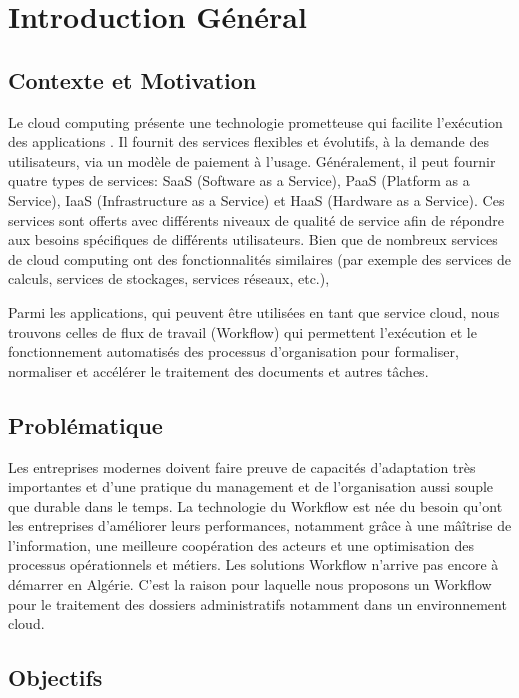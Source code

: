 \chapter*{Introduction Général }


\section*{Contexte et Motivation} 
Le cloud computing  présente une technologie prometteuse qui facilite l'exécution des applications . Il fournit des services flexibles et évolutifs, à la demande des utilisateurs, via un modèle de paiement à l'usage. Généralement, il peut fournir quatre types de services: SaaS (Software as a Service), PaaS (Platform as a Service), IaaS (Infrastructure as a Service) et HaaS (Hardware as a Service). Ces services sont offerts avec différents niveaux de qualité de service afin de répondre aux besoins spécifiques de différents utilisateurs. Bien que de nombreux services de cloud computing  ont des fonctionnalités similaires (par exemple des services de calculs, services de stockages, services  réseaux, etc.),

Parmi les  applications, qui peuvent être  utilisées en tant que service cloud, nous trouvons celles de flux de travail (Workflow)  qui permettent l'exécution et le fonctionnement automatisés des processus d'organisation pour formaliser, normaliser et accélérer le traitement des documents et autres tâches.




\section*{Problématique}

Les entreprises modernes doivent faire preuve de capacités d'adaptation très importantes et d'une pratique du management et de l'organisation aussi souple que durable dans le temps.  La technologie du Workflow est née du besoin qu'ont les entreprises d'améliorer leurs performances, notamment grâce à une mâîtrise de l'information, une meilleure coopération des acteurs et une optimisation des processus opérationnels et métiers. Les solutions Workflow n’arrive pas encore à démarrer en Algérie. C’est la raison pour laquelle nous  proposons un Workflow pour le traitement des dossiers administratifs notamment dans un environnement cloud.


 
\section*{Objectifs}


